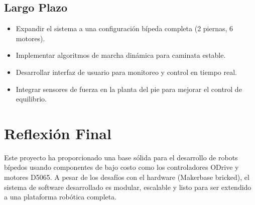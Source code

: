 \subsection{Largo Plazo}
\begin{itemize}
    \item Expandir el sistema a una configuración bípeda completa (2 piernas, 6 motores).
    \item Implementar algoritmos de marcha dinámica para caminata estable.
    \item Desarrollar interfaz de usuario para monitoreo y control en tiempo real.
    \item Integrar sensores de fuerza en la planta del pie para mejorar el control de equilibrio.
\end{itemize}

\section{Reflexión Final}

Este proyecto ha proporcionado una base sólida para el desarrollo de robots bípedos usando componentes de bajo costo como los controladores ODrive y motores D5065. A pesar de los desafíos con el hardware (Makerbase bricked), el sistema de software desarrollado es modular, escalable y listo para ser extendido a una plataforma robótica completa.
